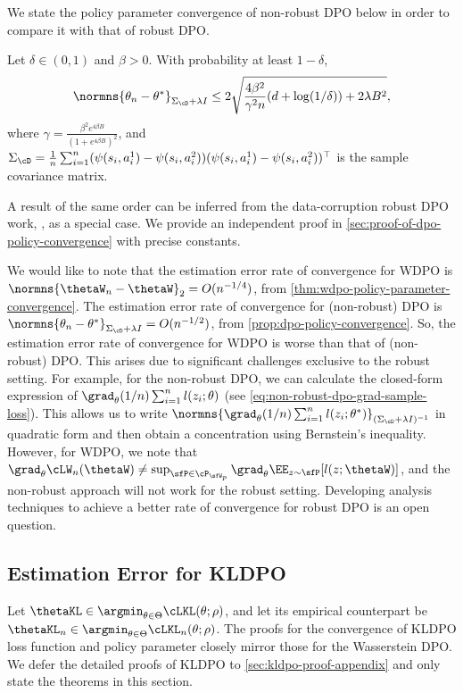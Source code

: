 We state the policy parameter convergence of non-robust DPO below in order to compare it with that of robust DPO. 
\begin{proposition}\label{prop:dpo-policy-convergence}
    Let $\delta\in(0,1)$ and $\beta>0$. With probability at least $1-\delta$, 
    \begin{equation*}
        \normns{\theta_n-\theta^*}_{\Sigma_{\cD}+\lambda I} \leq 2\sqrt{\frac{4\beta^2}{\gamma^2 n}(d+\log(1/\delta)) + 2\lambda B^2},
    \end{equation*}
    where $\gamma=\frac{\beta^2e^{4\beta B}}{(1+e^{4\beta B})^2}$, and $\Sigma_{\cD} = \frac{1}{n}\sum_{i=1}^n(\psi(s_i,a^1_i)-\psi(s_i,a_i^2))(\psi(s_i,a^1_i)-\psi(s_i,a_i^2))^{\top}$ is the sample covariance matrix.
\end{proposition}
A result of the same order can be inferred from the data-corruption robust DPO work, \citet[Theorem 4.2]{chowdhury2024provably}, as a special case. We provide an independent proof in \cref{sec:proof-of-dpo-policy-convergence} with precise constants. 

\begin{remark}
    We would like to note that the estimation error rate of convergence for WDPO is $\normns{\thetaW_n-\thetaW}_2=O(n^{-1/4})$, from \cref{thm:wdpo-policy-parameter-convergence}. The estimation error rate of convergence for (non-robust) DPO is $\normns{\theta_n-\theta^*}_{\Sigma_{\cD}+\lambda I}=O(n^{-1/2})$, from \cref{prop:dpo-policy-convergence}. So, the estimation error rate of convergence for WDPO is worse than that of  (non-robust) DPO. This arises due to significant challenges exclusive to the robust setting. For example, for the non-robust DPO, we can calculate the closed-form expression of $\grad_\theta (1/n)\sum_{i=1}^n l(z_i;\theta)$ (see \cref{eq:non-robust-dpo-grad-sample-loss}). This allows us to write $\normns{\grad_\theta (1/n)\sum_{i=1}^n l(z_i;\theta^*)}_{(\Sigma_{\cD}+\lambda I)^{-1}}$ in quadratic form and then obtain a concentration using Bernstein's inequality. However, for WDPO, we note that $\grad_\theta \cLW_n(\thetaW)\neq \sup_{\sfP\in\cP_{\sfW_p}}\grad_\theta \EE_{z\sim\sfP}[l(z;\thetaW)]$, and the non-robust approach will not work for the robust setting. Developing analysis techniques to achieve a better rate of convergence for robust DPO is an open question. 
\end{remark}


\subsection{Estimation Error for KLDPO}
Let $\thetaKL\in\argmin_{\theta\in\Theta}\cLKL(\theta;\rho)$, and let its empirical counterpart be $\thetaKL_n\in\argmin_{\theta\in\Theta}\cLKL_n(\theta;\rho)$. The proofs for the convergence of KLDPO loss function and policy parameter closely mirror those for the Wasserstein DPO. We defer the detailed proofs of KLDPO to \cref{sec:kldpo-proof-appendix} and only state the theorems in this section.


